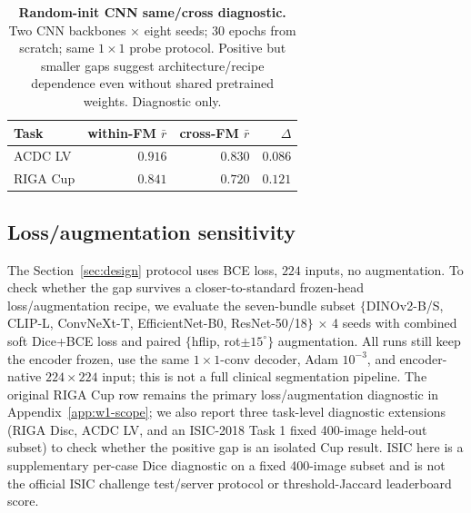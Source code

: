 \begin{table}[!htbp]
  \caption{\textbf{Random-init CNN same/cross diagnostic.} Two CNN backbones $\times$ eight seeds; 30 epochs from scratch; same $1{\times}1$ probe protocol. Positive but smaller gaps suggest architecture/recipe dependence even without shared pretrained weights. Diagnostic only.}
  \label{tab:m9}
  \centering\small
  \begin{tabular}{lrrr}
    \toprule
    Task & within-FM $\bar r$ & cross-FM $\bar r$ & $\Delta$ \\
    \midrule
    ACDC LV  & $0.916$ & $0.830$ & $0.086$ \\
    RIGA Cup & $0.841$ & $0.720$ & $0.121$ \\
    \bottomrule
  \end{tabular}
\end{table}

\subsection{Loss/augmentation sensitivity}
\label{app:m14}

The Section~\ref{sec:design} protocol uses BCE loss, $224$ inputs, no augmentation. To check whether the gap survives a closer-to-standard frozen-head loss/augmentation recipe, we evaluate the seven-bundle subset $\{$DINOv2-B/S, CLIP-L, ConvNeXt-T, EfficientNet-B0, ResNet-50/18$\}$ $\times$ 4 seeds with combined soft Dice+BCE loss and paired $\{$hflip, rot$\pm 15^{\circ}\}$ augmentation. All runs still keep the encoder frozen, use the same $1{\times}1$-conv decoder, Adam $10^{-3}$, and encoder-native $224{\times}224$ input; this is not a full clinical segmentation pipeline. The original RIGA Cup row remains the primary loss/augmentation diagnostic in Appendix~\ref{app:w1-scope}; we also report three task-level diagnostic extensions (RIGA Disc, ACDC LV, and an ISIC-2018 Task 1 fixed 400-image held-out subset) to check whether the positive gap is an isolated Cup result. ISIC here is a supplementary per-case Dice diagnostic on a fixed 400-image subset and is not the official ISIC challenge test/server protocol or threshold-Jaccard leaderboard score.

